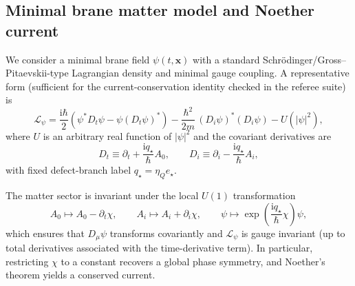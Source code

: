 \documentclass[11pt]{article}
\newcommand{\ii}{\mathrm i}
\newcommand{\etaQ}{\eta_Q}
\newcommand{\estar}{e_\star}
\newcommand{\qstar}{q_\star}
\begin{document}
\subsection{Minimal brane matter model and Noether current}
\label{sec:noether_current}

We consider a minimal brane field \(\psi(t,\mathbf x)\) with a standard
Schr\"odinger/Gross--Pitaevskii-type Lagrangian density and minimal gauge
coupling. A representative form (sufficient for the current-conservation identity
checked in the referee suite) is
\begin{equation}
  \mathcal L_\psi
  =
  \frac{\ii\hbar}{2}\!\left(\psi^* D_t\psi - \psi (D_t\psi)^*\right)
  -\frac{\hbar^2}{2m}\,(D_i\psi)^*(D_i\psi)
  -U(|\psi|^2),
  \label{eq:L_matter}
\end{equation}
where \(U\) is an arbitrary real function of \(|\psi|^2\) and the covariant
derivatives are
\begin{equation}
  D_t \equiv \partial_t + \frac{\ii \qstar}{\hbar}A_0,
  \qquad
  D_i \equiv \partial_i - \frac{\ii \qstar}{\hbar}A_i,
  \label{eq:covariant_derivatives}
\end{equation}
with fixed defect-branch label \(\qstar=\etaQ\estar\).

The matter sector is invariant under the local \(U(1)\) transformation
\begin{equation}
  A_0 \mapsto A_0-\partial_t\chi,
  \qquad
  A_i \mapsto A_i+\partial_i\chi,
  \qquad
  \psi \mapsto \exp\!\left(\frac{\ii \qstar}{\hbar}\chi\right)\psi,
  \label{eq:matter_gauge_transform}
\end{equation}
which ensures that \(D_\mu\psi\) transforms covariantly and \(\mathcal L_\psi\)
is gauge invariant (up to total derivatives associated with the time-derivative
term). In particular, restricting \(\chi\) to a constant recovers a global phase
symmetry, and Noether's theorem yields a conserved current.
\end{document}
